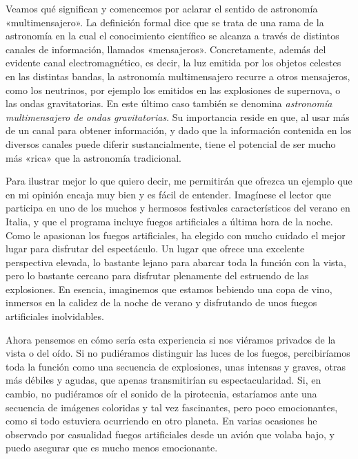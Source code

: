 Veamos qué significan y comencemos por aclarar el sentido de astronomía «multimensajero». La definición formal dice que se trata de una rama de la astronomía en la cual el conocimiento científico se alcanza a través de distintos canales de información, llamados «mensajeros». Concretamente, además del evidente canal electromagnético, es decir, la luz emitida por los objetos celestes en las distintas bandas, la astronomía multimensajero recurre a otros mensajeros, como los neutrinos, por ejemplo los emitidos en las explosiones de supernova, o las ondas gravitatorias. En este último caso también se denomina \emph{astronomía multimensajero de ondas gravitatorias}. Su importancia reside en que, al usar más de un canal para obtener información, y dado que la información contenida en los diversos canales puede diferir sustancialmente, tiene el potencial de ser mucho más «rica» que la astronomía tradicional.

Para ilustrar mejor lo que quiero decir, me permitirán que ofrezca un ejemplo que en mi opinión encaja muy bien y es fácil de entender. Imagínese el lector que participa en uno de los muchos y hermosos festivales característicos del verano en Italia, y que el programa incluye fuegos artificiales a última hora de la noche. Como le apasionan los fuegos artificiales, ha elegido con mucho cuidado el mejor lugar para disfrutar del espectáculo. Un lugar que ofrece una excelente perspectiva elevada, lo bastante lejano para abarcar toda la función con la vista, pero lo bastante cercano para disfrutar plenamente del estruendo de las explosiones. En esencia, imaginemos que estamos bebiendo una copa de vino, inmersos en la calidez de la noche de verano y disfrutando de unos fuegos artificiales inolvidables.

Ahora pensemos en cómo sería esta experiencia si nos viéramos privados de la vista o del oído. Si no pudiéramos distinguir las luces de los fuegos, percibiríamos toda la función como una secuencia de explosiones, unas intensas y graves, otras más débiles y agudas, que apenas transmitirían su espectacularidad. Si, en cambio, no pudiéramos oír el sonido de la pirotecnia, estaríamos ante una secuencia de imágenes coloridas y tal vez fascinantes, pero poco emocionantes, como si todo estuviera ocurriendo en otro planeta. En varias ocasiones he observado por casualidad fuegos artificiales desde un avión que volaba bajo, y puedo asegurar que es mucho menos emocionante.

